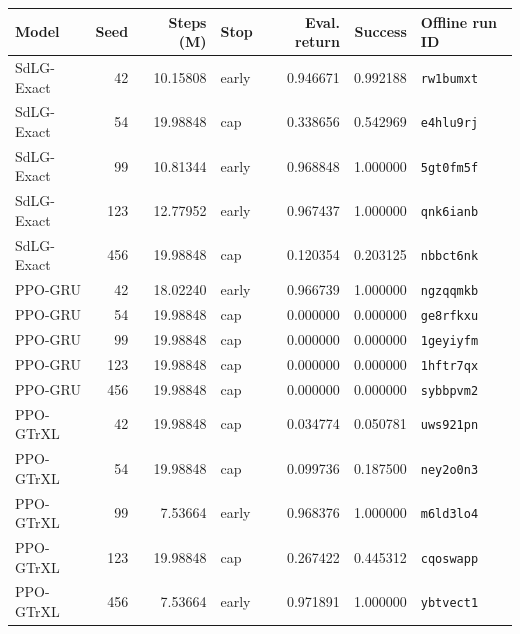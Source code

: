 \begin{tabular}{lrrlrrl}
\toprule
Model & Seed & Steps (M) & Stop & Eval. return & Success & Offline run ID \\
\midrule
SdLG-Exact & 42 & 10.15808 & early & 0.946671 & 0.992188 & \texttt{rw1bumxt} \\
SdLG-Exact & 54 & 19.98848 & cap & 0.338656 & 0.542969 & \texttt{e4hlu9rj} \\
SdLG-Exact & 99 & 10.81344 & early & 0.968848 & 1.000000 & \texttt{5gt0fm5f} \\
SdLG-Exact & 123 & 12.77952 & early & 0.967437 & 1.000000 & \texttt{qnk6ianb} \\
SdLG-Exact & 456 & 19.98848 & cap & 0.120354 & 0.203125 & \texttt{nbbct6nk} \\
PPO-GRU & 42 & 18.02240 & early & 0.966739 & 1.000000 & \texttt{ngzqqmkb} \\
PPO-GRU & 54 & 19.98848 & cap & 0.000000 & 0.000000 & \texttt{ge8rfkxu} \\
PPO-GRU & 99 & 19.98848 & cap & 0.000000 & 0.000000 & \texttt{1geyiyfm} \\
PPO-GRU & 123 & 19.98848 & cap & 0.000000 & 0.000000 & \texttt{1hftr7qx} \\
PPO-GRU & 456 & 19.98848 & cap & 0.000000 & 0.000000 & \texttt{sybbpvm2} \\
PPO-GTrXL & 42 & 19.98848 & cap & 0.034774 & 0.050781 & \texttt{uws921pn} \\
PPO-GTrXL & 54 & 19.98848 & cap & 0.099736 & 0.187500 & \texttt{ney2o0n3} \\
PPO-GTrXL & 99 & 7.53664 & early & 0.968376 & 1.000000 & \texttt{m6ld3lo4} \\
PPO-GTrXL & 123 & 19.98848 & cap & 0.267422 & 0.445312 & \texttt{cqoswapp} \\
PPO-GTrXL & 456 & 7.53664 & early & 0.971891 & 1.000000 & \texttt{ybtvect1} \\
\bottomrule
\end{tabular}
